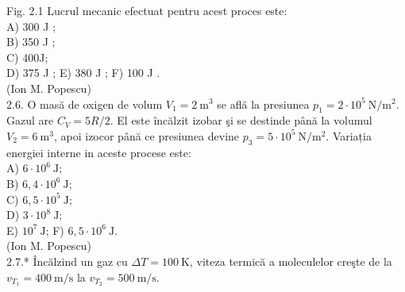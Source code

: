 Fig. 2.1 Lucrul mecanic efectuat pentru acest proces este:\\
A) 300 J ;\\
B) 350 J ;\\
C) 400J;\\
D) 375 J ; E) 380 J ; F) 100 J .\\
(Ion M. Popescu)\\
2.6. O masă de oxigen de volum $V_{1}=2 \mathrm{~m}^{3}$ se află la presiunea $p_{1}=2 \cdot 10^{5} \mathrm{~N} / \mathrm{m}^{2}$. Gazul are $C_{V}=5 R / 2$. El este încălzit izobar şi se destinde până la volumul $V_{2}=6 \mathrm{~m}^{3}$, apoi izocor până ce presiunea devine $p_{3}=5 \cdot 10^{5} \mathrm{~N} / \mathrm{m}^{2}$. Variația energiei interne in aceste procese este:\\
A) $6 \cdot 10^{6} \mathrm{~J}$;\\
B) $6,4 \cdot 10^{6} \mathrm{~J}$;\\
C) $6,5 \cdot 10^{5} \mathrm{~J}$;\\
D) $3 \cdot 10^{8} \mathrm{~J}$;\\
E) $10^{7} \mathrm{~J}$; F) $6,5 \cdot 10^{6} \mathrm{~J}$.\\
(Ion M. Popescu)\\
2.7.* Încălzind un gaz cu $\Delta T=100 \mathrm{~K}$, viteza termică a moleculelor creşte de la $v_{T_{1}}=400 \mathrm{~m} / \mathrm{s}$ la $v_{T_{2}}=500 \mathrm{~m} / \mathrm{s}$.

